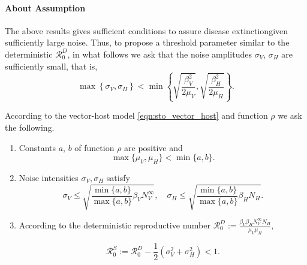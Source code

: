 \paragraph{About Assumption}
The above results gives sufficient conditions to assure 
disease extinction\textemdash given sufficiently large noise. Thus, 
to propose a threshold parameter similar  to the deterministic
$\mathcal{R}_0^D$, in what follows we ask that the noise amplitudes 
$\sigma_V$, $\sigma_H$ are sufficiently small, that is,
\begin{equation}\label{eqn:noise_small_condition}
    \displaystyle
    \max
        \left \{
              \sigma_V, \sigma_H 
        \right\} 
        < 
    \min 
        \left \{
            \sqrt{\frac{\beta_V ^ 2}{2 \mu_V}},
            \sqrt{\frac{\beta_H ^ 2}{2 \mu_H}}
        \right \}.
\end{equation}
%
%
%
\begin{assumption}\label{ass:extinction}
    According to the vector-host model \eqref{eqn:sto_vector_host} and 
    function
    $\rho$
    we ask the following.
    \begin{enumerate}[\bf{(E\textendash}1)]
        \item 
            Constants $a$, $b$ of function $\rho$ are positive and
            $$
                \max \{\mu_V, \mu_H \} < \min \{a, b \}.
            $$
        \item \label{ass:noise_condition}
            Noise intensities $\sigma_V, \sigma_H$ satisfy
            $$
                \sigma_V \leq 
                    \sqrt{
                        \frac{
                            \min\{a, b\}
                        }{
                            \max \{a, b \}
                        }
                    \beta_V  N_V^{\infty}
                    },
                 \quad
                \sigma_H \leq
                    \sqrt{
                        \frac{
                            \min\{a, b\}
                        }{
                            \max \{a, b \}
                        } 
                        \beta_H N_H 
                    } .
            $$
        \item
            According to the deterministic reproductive
            number 
            $   \displaystyle
                \mathcal{R}_0 ^ D :=
                    \frac{
                         \beta_V \beta_H 
                         N_V ^ \infty N_H
                    }{
                        \mu_V \mu_H
                    }
            $,

            $$
            \mathcal{R}_0 ^ S :=
                \mathcal{R}_0^D - 
                \frac{1}{2}
                \left( 
                    \sigma_V ^ 2
                    +
                    \sigma_H ^ 2
                \right)
                <1 .
            $$
    \end{enumerate}
\end{assumption}
